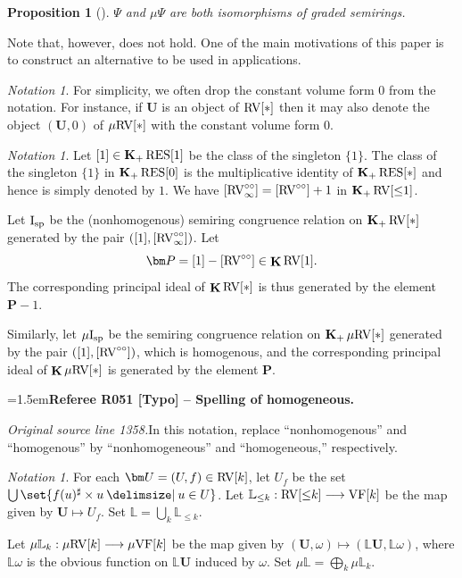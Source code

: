 \documentclass[12pt]{amsart}
\newcommand{\RefereeRemark}[4]{%
  \par\medskip\begingroup\normalfont\small\color{RefereePurple}%
  \emergencystretch=1.5em\noindent\textbf{Referee R#1 [#2] -- #3.}\par\nobreak\noindent #4\par
  \endgroup\medskip
}
\theoremstyle{plain}
\newtheorem{prop}[thm]{Proposition}
\theoremstyle{definition}
\theoremstyle{remark}
\newtheorem{nota}[thm]{Notation}
\numberwithin{equation}{section}
\theoremstyle{plain}
\newcommand{\VF}{\textup{VF}}
\newcommand{\RV}{\textup{RV}}
\newcommand{\0}{\emptyset}
\newcommand{\bb}[1]{\mathbb{#1}}
\newcommand{\fun}{\longrightarrow}
\newcommand{\efun}{\longmapsto}
\providecommand\given{}
\newcommand\SetSymbol[1][]{%
\nonscript \: #1 \vert
\allowbreak
\nonscript\:
\mathopen{}}
\renewcommand\given{\SetSymbol[\delimsize]}
\newcommand{\mgVF}{{\mu} {\VF}}
\newcommand{\mgRV}{{\mu}{\RV}}
\newcommand{\RES}{\textup{RES}}
\newcommand{\isp}{\textup{I}_{\textup{sp}}}
\newcommand{\mgisp}{\mu \isp}
\newcommand{\mgL}{{\mu}{\bb L}}
\DeclareMathOperator{\gsk}{\mathbf{K}_+}
\DeclareMathOperator{\ggk}{\mathbf{K}}
\newcommand{\ccirc}{\circ \circ}
\begin{document}
\begin{prop}[{\cite[Corollary~10.3, Proposition~10.10(1)]{hrushovski:kazhdan:integration:vf}}]\label{red:D:iso}
$\Psi$ and ${\mu}\Psi$ are both isomorphisms of graded semirings.
\end{prop}

Note that, however, \cite[Proposition~10.10(2)]{hrushovski:kazhdan:integration:vf} does not hold. One of the main motivations of this paper is to construct an alternative to be used in applications.

\begin{nota}\label{drop:0}
For simplicity, we often drop the constant volume form $0$ from the notation. For instance, if $\bm U$ is an object of $\RV[*]$ then it may also denote the  object $(\bm U, 0)$ of $\mgRV[*]$ with the constant volume form $0$.
\end{nota}

\begin{nota}
Let $[1] \in \gsk \RES[1]$ be the class of the singleton $\{1\}$. The class of the singleton $\{1\}$ in $\gsk \RES[0]$ is the multiplicative identity of $\gsk \RES[*]$ and hence is simply denoted by $1$. We have $[\RV^{\circ\circ}_\infty] = [\RV^{\circ\circ}] + 1$ in $\gsk \RV[{\leq} 1]$.

Let $\isp$ be the (nonhomogenous) semiring congruence relation on $\gsk \RV[*]$ generated by the pair $([1], [\RV^{\circ\circ}_\infty])$. Let
\[
\bm P = [1]-[\RV^{\ccirc}]  \in \ggk \RV[1].
\]
The corresponding principal ideal of $\ggk \RV[*]$ is thus generated by the element $\bm P - 1$.


Similarly, let $\mgisp$ be the  semiring congruence relation on $\gsk \mgRV[*]$ generated by the pair $([1], [\RV^{\circ\circ}])$, which is homogenous, and the corresponding principal ideal of $\ggk \mgRV[*]$ is generated by the element $\bm P$.
\end{nota}

\RefereeRemark{051}{Typo}{Spelling of homogeneous}{%
\textit{Original source line 1358.}\quad In this notation, replace ``nonhomogenous'' and ``homogenous'' by ``nonhomogeneous'' and ``homogeneous,'' respectively.
}

\begin{nota}\label{RVcat:tag}
For each  $\bm U = (U, f) \in  \RV[k]$, let $U_f$ be the set $\bigcup \set{f(u)^\sharp \times u \given u \in U}$. Let $\mathbb{L}_{\leq k}: \RV[{\leq}k] \fun \VF[k]$ be the map  given by $\bm U \efun U_f$. Set $\bb L = \bigcup_k \bb L_{\leq k}$.

Let $\mgL_k: \mgRV[k] \fun \mgVF[k]$ be the map given by $(\bm U, \omega) \efun (\bb L \bm U, \bb L \omega)$, where $\bb L \omega$ is the obvious function on $\bb L \bm U$ induced by $\omega$. Set $\mgL = \bigoplus_k \mgL_{k}$.
\end{nota}
\end{document}
